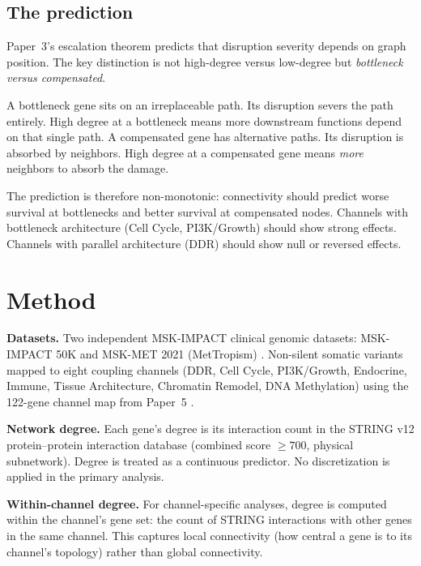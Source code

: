 \documentclass[11pt]{article}
\begin{document}
\subsection{The prediction}

Paper~3's escalation theorem predicts that disruption severity
depends on graph position. The key distinction is not high-degree
versus low-degree but \emph{bottleneck versus compensated}.

A bottleneck gene sits on an irreplaceable path. Its disruption
severs the path entirely. High degree at a bottleneck means more
downstream functions depend on that single path. A compensated
gene has alternative paths. Its disruption is absorbed by
neighbors. High degree at a compensated gene means \emph{more}
neighbors to absorb the damage.

The prediction is therefore non-monotonic: connectivity should
predict worse survival at bottlenecks and better survival at
compensated nodes. Channels with bottleneck architecture (Cell
Cycle, PI3K/Growth) should show strong effects. Channels with
parallel architecture (DDR) should show null or reversed effects.

\section{Method}
\label{sec:method}

\textbf{Datasets.}
Two independent MSK-IMPACT clinical genomic datasets:
MSK-IMPACT 50K \cite{Bandlamudi2024} and MSK-MET 2021
(MetTropism) \cite{Nguyen2022}. Non-silent somatic variants
mapped to eight coupling channels (DDR, Cell Cycle, PI3K/Growth,
Endocrine, Immune, Tissue Architecture, Chromatin Remodel,
DNA Methylation) using the 122-gene
channel map from Paper~5 \cite{McCarthy2026e}.

\textbf{Network degree.}
Each gene's degree is its interaction count in the STRING v12
protein--protein interaction database \cite{Szklarczyk2023}
(combined score $\geq 700$, physical subnetwork). Degree is
treated as a continuous predictor. No discretization is applied
in the primary analysis.

\textbf{Within-channel degree.}
For channel-specific analyses, degree is computed within the
channel's gene set: the count of STRING interactions with other
genes in the same channel. This captures local connectivity
(how central a gene is to its channel's topology) rather than
global connectivity.
\end{document}
